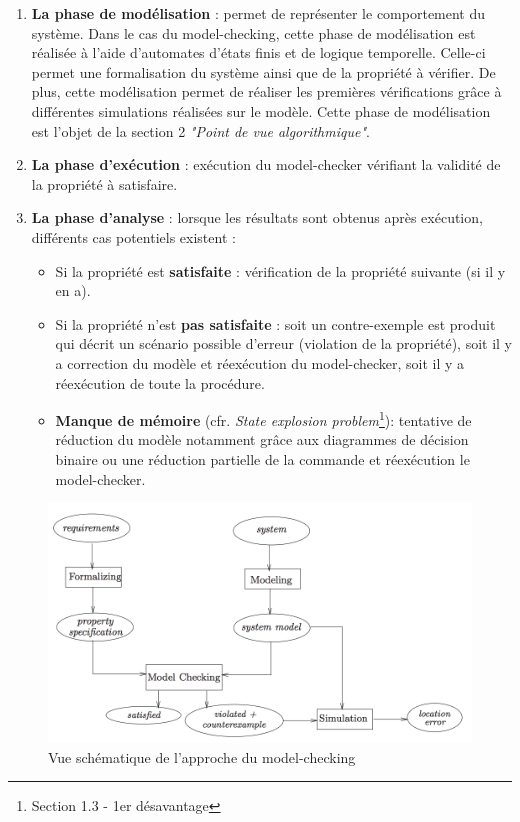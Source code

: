 \documentclass[runningheads,a4paper,10pt]{llncs}
\begin{document}
\begin{enumerate}
 \item  \textbf{La phase de modélisation} : permet de représenter le comportement du système. Dans le cas du model-checking, cette phase de modélisation est réalisée à l'aide d'automates d'états finis et de logique temporelle. Celle-ci permet une formalisation du système ainsi que de la propriété à vérifier. De plus, cette modélisation permet de réaliser les premières vérifications grâce à différentes simulations réalisées sur le modèle. Cette phase de modélisation est l'objet de la section 2 \textit{"Point de vue algorithmique"}. 
 \item  \textbf{La phase d'exécution} : exécution du model-checker vérifiant la validité de la propriété à satisfaire. 
 \item  \textbf{La phase d'analyse} : lorsque les résultats sont obtenus après exécution, différents cas potentiels existent : 
 \begin{itemize}
 \item Si la propriété est \textbf{satisfaite} : vérification de la propriété suivante (si il y en a). 
 \item Si la propriété n'est \textbf{pas satisfaite} : soit un contre-exemple est produit qui décrit un scénario possible d’erreur (violation de la propriété), soit il y a correction du modèle et réexécution du model-checker, soit il y a réexécution de toute la procédure. 
 \item \textbf{Manque de mémoire} (cfr. \textit{State explosion problem}\footnote{Section 1.3 - 1er désavantage}): tentative de réduction du modèle notamment grâce aux diagrammes de décision binaire ou une réduction partielle de la commande et réexécution le model-checker. 
 \end{itemize}
 \end{enumerate} 
 
 \newpage
 
\begin{figure}
  \centering
   \includegraphics[scale=0.7]{figures/schematic-view.png}
   \caption[Caption for LOF]{Vue schématique de l'approche du model-checking\protect\footnotemark}
\end{figure}
\end{document}
